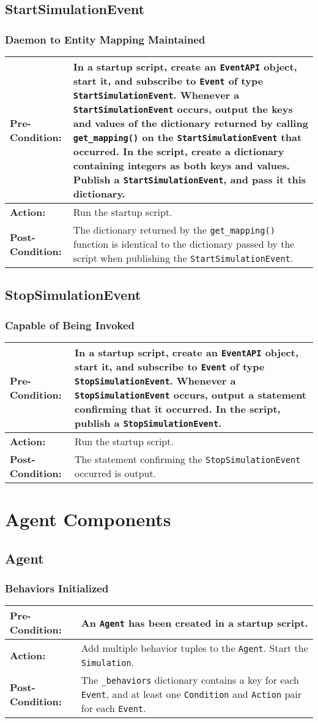 \documentclass[titlepage]{article}
\newcommand{\testcase}[3]{
    \begin{center}
    \begin{tabular}{| l | p{0.7\textwidth}|}
        \hline
        \rowcolor[gray]{0.8}\textbf{Pre-Condition:} & #1 \\ \hline
        \textbf{Action:} & #2 \\ \hline
        \rowcolor[gray]{0.8}\textbf{Post-Condition:} & #3 \\ \hline
    \end{tabular}
    \end{center}
}
\begin{document}
\subsection{StartSimulationEvent}
\subsubsection{Daemon to Entity Mapping Maintained}
\testcase{In a startup script, create an \texttt{EventAPI} object, start it, and subscribe to \texttt{Event} of type \texttt{StartSimulationEvent}. Whenever a \texttt{StartSimulationEvent} occurs, output the keys and values of the dictionary returned by calling \texttt{get\_mapping()} on the \texttt{StartSimulationEvent} that occurred. In the script, create a dictionary containing integers as both keys and values. Publish a \texttt{StartSimulationEvent}, and pass it this dictionary.}{Run the startup script.}{The dictionary returned by the \texttt{get\_mapping()} function is identical to the dictionary passed by the script when publishing the \texttt{StartSimulationEvent}.}

\subsection{StopSimulationEvent}
\subsubsection{Capable of Being Invoked}
\testcase{In a startup script, create an \texttt{EventAPI} object, start it, and subscribe to \texttt{Event} of type \texttt{StopSimulationEvent}. Whenever a \texttt{StopSimulationEvent} occurs, output a statement confirming that it occurred. In the script, publish a \texttt{StopSimulationEvent}.}{Run the startup script.}{The statement confirming the \texttt{StopSimulationEvent} occurred is output.}

\section{Agent Components}
\subsection{Agent}
\subsubsection{Behaviors Initialized}
\testcase{An \texttt{Agent} has been created in a startup script.}{Add multiple behavior tuples to the \texttt{Agent}. Start the \texttt{Simulation}.}{The \texttt{\_behaviors} dictionary contains a key for each \texttt{Event}, and at least one \texttt{Condition} and \texttt{Action} pair for each \texttt{Event}.}
\end{document}
